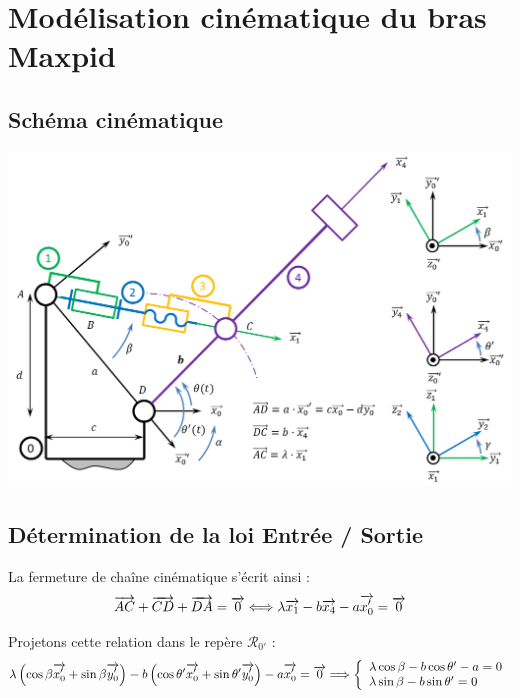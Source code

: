 \documentclass[10pt,fleqn]{article} %
\begin{document}






\section{Modélisation cinématique du bras Maxpid}
\subsection{Schéma cinématique}


\begin{center}
 \includegraphics[width=.95\textwidth]{images/schema_02}
\end{center}

\subsection{Détermination de la loi Entrée / Sortie}

La fermeture de chaîne cinématique s'écrit ainsi : 
$$
\overrightarrow{AC}+\overrightarrow{CD}+\overrightarrow{DA}=\overrightarrow{0} 
\Longleftrightarrow
\lambda\overrightarrow{x_1} - b \overrightarrow{x_4} - a \overrightarrow{x_0'} = \overrightarrow{0}
$$

Projetons cette relation dans le repère $\mathcal{R}_{0'}$ :
$$
\lambda\left(\cos\beta \overrightarrow{x_0'}+\sin \beta \overrightarrow{y_0'} \right) 
- b \left(\cos\theta' \overrightarrow{x_0'}+\sin \theta' \overrightarrow{y_0'} \right) - a \overrightarrow{x_0'} = \overrightarrow{0}
\Longrightarrow 
\left\{
\begin{array}{l}
\lambda\cos\beta - b \cos\theta' - a  = 0 \\
\lambda\sin \beta - b \sin \theta' = 0
\end{array}
\right.
$$
\end{document}
